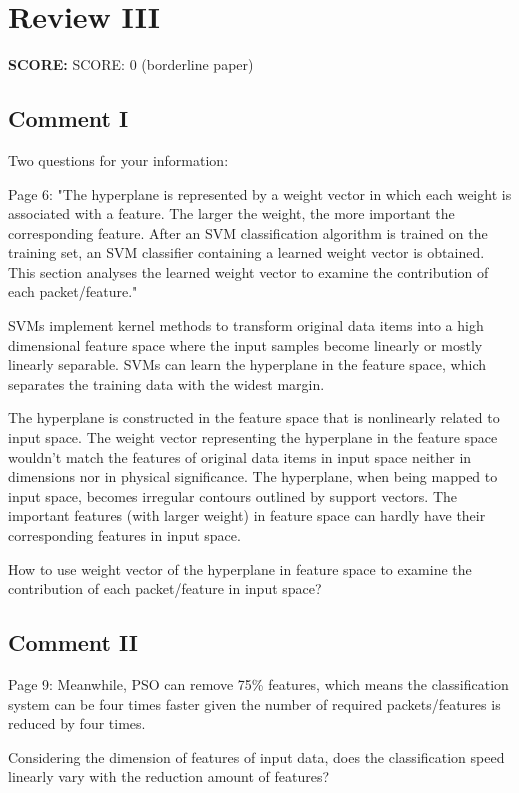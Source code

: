 \documentclass[runningheads]{llncs}
\begin{document}
\section{Review III}

\textbf{SCORE:} SCORE: 0 (borderline paper)

\subsection{Comment I}

Two questions for your information:

Page 6: "The hyperplane is represented by a weight vector in which each weight is associated with a feature. The larger the weight, the more important the corresponding feature. After an SVM classification algorithm is trained on the training set, an SVM classifier containing a learned weight vector is obtained. This section analyses the learned weight vector to examine the contribution of each packet/feature."

SVMs implement kernel methods to transform original data items into a high dimensional feature space where the input samples become linearly or mostly linearly separable. SVMs can learn the hyperplane in the feature space, which separates the training data with the widest margin.

The hyperplane is constructed in the feature space that is nonlinearly related to input space. The weight vector representing the hyperplane in the feature space wouldn't match the features of original data items in input space neither in dimensions nor in physical significance. The hyperplane, when being mapped to input space, becomes irregular contours outlined by support vectors. The important features (with larger weight) in feature space can hardly have their corresponding features in input space.

How to use weight vector of the hyperplane in feature space to examine the contribution of each packet/feature in input space?

\subsection{Comment II}

Page 9: Meanwhile, PSO can remove 75\% features, which means the classification system can be four times faster given the number of required packets/features is reduced by four times.

Considering the dimension of features of input data, does the classification speed linearly vary with the reduction amount of features?


% 

\end{document}
